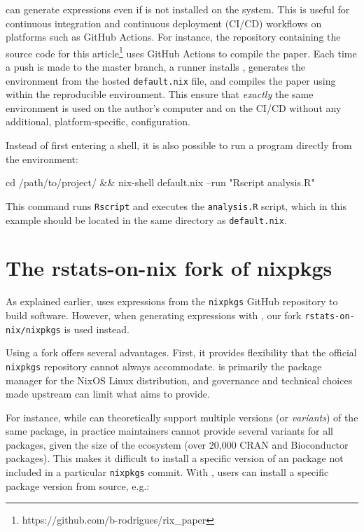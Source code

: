 \documentclass[
  article]{jss}
\begin{document}
 can generate  expressions even if  is not
installed on the system. This is useful for continuous integration and
continuous deployment (CI/CD) workflows on platforms such as GitHub
Actions. For instance, the repository containing the source code for
this article\footnote{https://github.com/b-rodrigues/rix\_paper} uses
GitHub Actions to compile the paper. Each time a push is made to the
master branch, a runner installs , generates the environment
from the hosted \texttt{default.nix} file, and compiles the paper using
 within the reproducible environment. This ensure that
\emph{exactly} the same environment is used on the author's computer and
on the CI/CD without any additional, platform-specific, configuration.

Instead of first entering a  shell, it is also possible to run
a program directly from the environment:

\begin{CodeInput}
cd /path/to/project/ && nix-shell default.nix --run "Rscript analysis.R"
\end{CodeInput}

This command runs \texttt{Rscript} and executes the \texttt{analysis.R}
script, which in this example should be located in the same directory as
\texttt{default.nix}.

\section{The rstats-on-nix fork of nixpkgs}\label{sec-fork}

As explained earlier,  uses expressions from the
\texttt{nixpkgs} GitHub repository to build software. However, when
generating expressions with , our fork
\texttt{rstats-on-nix/nixpkgs} is used instead.

Using a fork offers several advantages. First, it provides flexibility
that the official \texttt{nixpkgs} repository cannot always accommodate.
 is primarily the package manager for the NixOS Linux
distribution, and governance and technical choices made upstream can
limit what  aims to provide.

For instance, while  can theoretically support multiple
versions (or \emph{variants}) of the same package, in practice
maintainers cannot provide several variants for all 
packages, given the size of the ecosystem (over 20,000 CRAN and
Bioconductor packages). This makes it difficult to install a specific
version of an  package not included in a particular
\texttt{nixpkgs} commit. With , users can install a specific
package version from source, e.g.:
\end{document}
